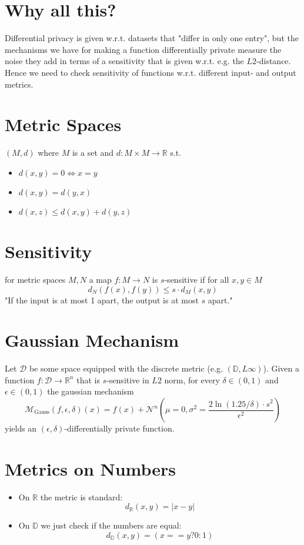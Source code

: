 \documentclass{article}
\begin{document}
\section*{Why all this?}
Differential privacy is given w.r.t. datasets that "differ in only one entry", but the mechanisms we have for making a function differentially private measure the noise they add in terms of a sensitivity that is given w.r.t. e.g. the $L2$-distance. Hence we need to check sensitivity of functions w.r.t. different input- and output metrics.

\section*{Metric Spaces}
$(M, d)$ where $M$ is a set and $d : M \times M \rightarrow \mathbb{R}$ s.t.
\begin{itemize}
   \item $d(x,y) = 0 \Leftrightarrow x = y$
   \item $d(x,y) = d(y,x)$
   \item $d(x,z) \leq d(x,y) + d(y,z)$
\end{itemize}

\section*{Sensitivity}
for metric spaces $M,N$ a map $f:M\rightarrow N$ is $s$-sensitive if for all $x,y \in M$
$$d_N(f(x), f(y)) \leq s \cdot d_M(x,y)$$
"If the input is at most 1 apart, the output is at most $s$ apart."

\section*{Gaussian Mechanism}
Let $\mathcal{D}$ be some space equipped with the discrete metric (e.g. $(\mathbb{D},L\infty)$). Given a function $f:\mathcal{D}\rightarrow \mathbb{R}^n$ that is $s$-sensitive in $L2$ norm, for every $\delta\in(0,1)$ and $\epsilon\in(0,1)$ the gaussian mechanism
\[\mathcal{M}_\text{Gauss}(f, \epsilon, \delta)(x) = f(x) + \mathcal{N}^n\left(\mu = 0, \sigma^2 = \frac{2 \ln (1.25/\delta) \cdot s^2}{\epsilon^2}\right)\]
yields an $(\epsilon,\delta)$-differentially private function.

\section*{Metrics on Numbers}
\begin{itemize}
   \item On $\mathbb{R}$ the metric is standard:
      $$d_\mathbb{R}(x,y) = |x-y|$$
   \item On $\mathbb{D}$ we just check if the numbers are equal:
      $$d_\mathbb{D}(x,y) = (x==y ? 0 : 1)$$
\end{itemize}
\end{document}
